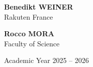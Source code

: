 \begin{titlepage}
\begin{minipage}{0.45\textwidth}
\centering
\textbf{Benedikt WEINER}\\[0.2cm]
Rakuten France
\end{minipage}
\hfill
\begin{minipage}{0.45\textwidth}
\centering
\textbf{Rocco MORA}\\[0.2cm]
Faculty of Science
\end{minipage}

\vfill

{\large Academic Year 2025 -- 2026}

\end{titlepage}